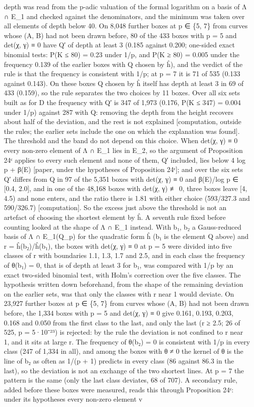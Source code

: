 \documentclass[11pt,a4paper]{article}
\theoremstyle{named}
\begin{document}
depth was read from the p-adic valuation of the formal logarithm on a basis of Λ ∩ E\_1 and checked against the denominators, and the minimum was taken over all elements of depth below 40. On 8,048 further boxes at p ∈ \{5, 7\} from curves whose (A, B) had not been drawn before, 80 of the 433 boxes with p = 5 and det(χ, γ) ≡ 0 have Q′ of depth at least 3 (0.185 against 0.200; one-sided exact binomial tests: P(K ≤ 80) = 0.23 under 1/p, and P(K ≥ 80) = 0.005 under the frequency 0.139 of the earlier boxes with Q chosen by ĥ), and the verdict of the rule is that the frequency is consistent with 1/p; at p = 7 it is 71 of 535 (0.133 against 0.143). On these boxes Q chosen by ĥ itself has depth at least 3 in 69 of 433 (0.159), so the rule separates the two choices by 11 boxes. Over all six sets built as for D the frequency with Q′ is 347 of 1,973 (0.176, P(K ≤ 347) = 0.004 under 1/p) against 287 with Q: removing the depth from the height recovers about half of the deviation, and the rest is not explained [computation, outside the rules; the earlier sets include the one on which the explanation was found]. The threshold and the band do not depend on this choice. When det(χ, γ) ≡ 0 every non-zero element of Λ ∩ E\_1 lies in E\_2, so the argument of Proposition 24ᶜ applies to every such element and none of them, Q′ included, lies below 4 log p + β(E) [paper, under the hypotheses of Proposition 24ᶜ]; and over the six sets Q′ differs from Q in 97 of the 5,351 boxes with det(χ, γ) ≡ 0 and β(E)/log p ∈ [0.4, 2.0], and in one of the 48,168 boxes with det(χ, γ) ≢ 0, three boxes leave [4, 4.5) and none enters, and the ratio there is 1.81 with either choice (593/327.3 and 590/326.7) [computation]. So the excess just above the threshold is not an artefact of choosing the shortest element by ĥ. A seventh rule fixed before counting looked at the shape of Λ ∩ E\_1 instead. With b₁, b₂ a Gauss-reduced basis of Λ ∩ E\_1(Q\_p) for the quadratic form ĥ (b₁ is the element Q above) and r = ĥ(b₂)/ĥ(b₁), the boxes with det(χ, γ) ≡ 0 at p = 5 were divided into five classes of r with boundaries 1.1, 1.3, 1.7 and 2.5, and in each class the frequency of θ(b₁) = 0, that is of depth at least 3 for b₁, was compared with 1/p by an exact two-sided binomial test, with Holm's correction over the five classes. The hypothesis written down beforehand, from the shape of the remaining deviation on the earlier sets, was that only the classes with r near 1 would deviate. On 23,927 further boxes at p ∈ \{5, 7\} from curves whose (A, B) had not been drawn before, the 1,334 boxes with p = 5 and det(χ, γ) ≡ 0 give 0.161, 0.193, 0.203, 0.168 and 0.050 from the first class to the last, and only the last (r ≥ 2.5; 26 of 525, p = 5·10⁻²³) is rejected: by the rule the deviation is not confined to r near 1, and it sits at large r. The frequency of θ(b₂) = 0 is consistent with 1/p in every class (247 of 1,334 in all), and among the boxes with θ ≠ 0 the kernel of θ is the line of b₂ as often as 1/(p + 1) predicts in every class (86 against 86.3 in the last), so the deviation is not an exchange of the two shortest lines. At p = 7 the pattern is the same (only the last class deviates, 68 of 707). A secondary rule, added before these boxes were measured, reads this through Proposition 24ᶜ: under its hypotheses every non-zero element v 
\end{document}
